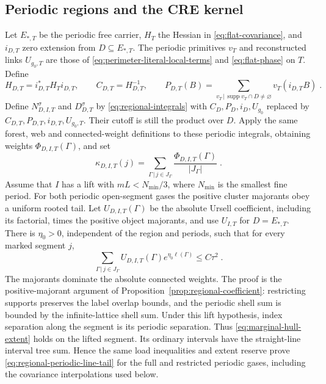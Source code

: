 \documentclass[11pt]{article}
\begin{document}
\subsection{Periodic regions and the CRE kernel}

Let $E_{*,T}$ be the periodic free carrier, $H_T$ the Hessian in \eqref{eq:flat-covariance}, and $i_{D,T}$ zero extension from $D\subseteq E_{*,T}$. The periodic primitives $v_T$ and reconstructed links $U_{g_0,T}$ are those of \eqref{eq:perimeter-literal-local-terms} and \eqref{eq:flat-phase} on $T$. Define
\begin{equation}\label{eq:regional-periodic-weight}
    H_{D,T}=i_{D,T}^*H_Ti_{D,T},
    \qquad C_{D,T}=H_{D,T}^{-1},
    \qquad P_{D,T}(B)=
        \sum_{v_T\, | \,\operatorname{supp}v_T\cap D\ne\varnothing}
            v_T(i_{D,T}B)\;.
\end{equation}
Define $N_{D,I,T}^\sigma$ and $D_{D,T}^\sigma$ by \eqref{eq:regional-integrals} with $C_D,P_D,i_D,U_{g_0}$ replaced by $C_{D,T},P_{D,T},i_{D,T},U_{g_0,T}$. Their cutoff is still the product over $D$. Apply the same forest, web and connected-weight definitions to these periodic integrals, obtaining weights $\Phi_{D,I,T}(\Gamma)$, and set
\begin{equation}
    \kappa_{D,I,T}(j)=
        \sum_{\Gamma\, | \,j\in J_\Gamma}
            \frac{\Phi_{D,I,T}(\Gamma)}{|J_\Gamma|}\;.
\end{equation}
Assume that $I$ has a lift with $mL<N_{\min}/3$, where $N_{\min}$ is the smallest fine period. For both periodic open-segment gases the positive cluster majorants obey a uniform rooted tail. Let $U_{D,I,T}(\Gamma)$ be the absolute Ursell coefficient, including its factorial, times the positive object majorants, and use $U_{I,T}$ for $D=E_{*,T}$. There is $\eta_0>0$, independent of the region and periods, such that for every marked segment $j$,
\begin{equation}\label{eq:regional-periodic-line-tail}
    \sum_{\Gamma\, | \,j\in J_\Gamma}
        U_{D,I,T}(\Gamma)e^{\eta_0\ell(\Gamma)}
        \leq C\tau^2\;.
\end{equation}
The majorants dominate the absolute connected weights. The proof is the positive-majorant argument of Proposition~\ref{prop:regional-coefficient}: restricting supports preserves the label overlap bounds, and the periodic shell sum is bounded by the infinite-lattice shell sum. Under this lift hypothesis, index separation along the segment is its periodic separation. Thus \eqref{eq:marginal-hull-extent} holds on the lifted segment. Its ordinary intervals have the straight-line interval tree sum. Hence the same load inequalities and extent reserve prove \eqref{eq:regional-periodic-line-tail} for the full and restricted periodic gases, including the covariance interpolations used below.
\end{document}
